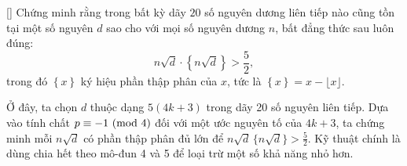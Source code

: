 \documentclass[../03-arithmetic-functions.tex]{subfiles}
\begin{document}
\begin{example*}\label{example:BMO-2015-P4}[\textbf{}]
	Chứng minh rằng trong bất kỳ dãy \( 20 \) số nguyên dương liên tiếp nào cũng tồn tại một số nguyên \( d \) sao cho với mọi số nguyên dương \( n \),
	bất đẳng thức sau luôn đúng:
	\[
		n \sqrt{d} \cdot \left\{n \sqrt{d} \right\} > \frac{5}{2},
	\]
	trong đó \( \left\{ x \right\} \) ký hiệu phần thập phân của \( x \), tức là \( \left\{ x \right\} = x - \lfloor x \rfloor \).
\end{example*}

\begin{story*}
    Ở đây, ta chọn \(d\) thuộc dạng \(5(4k + 3)\) trong dãy 20 số nguyên liên tiếp.
	Dựa vào tính chất \(p \equiv -1 \ (\mathrm{mod}\ 4)\) đối với một ước nguyên tố của \(4k+3\),
	ta chứng minh mỗi \(n\sqrt{d}\) có phần thập phân đủ lớn để \(n\sqrt{d}\,\{n\sqrt{d}\} > \tfrac{5}{2}\).
	Kỹ thuật chính là dùng chia hết theo mô-đun 4 và 5 để loại trừ một số khả năng nhỏ hơn.
\end{story*}
\end{document}

